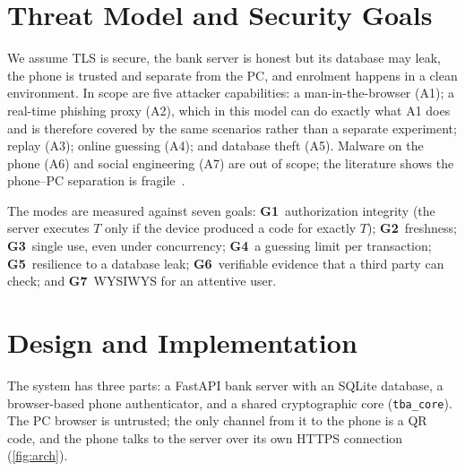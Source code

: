 \section{Threat Model and Security Goals}\label{sec:main-threat}
We assume TLS is secure, the bank server is honest but its database may leak,
the phone is trusted and separate from the PC, and enrolment happens in a clean
environment. In scope are five attacker capabilities: a man-in-the-browser (A1);
a real-time phishing proxy (A2), which in this model can do exactly what A1 does
and is therefore covered by the same scenarios rather than a separate
experiment; replay (A3); online guessing (A4); and database theft (A5). Malware
on the phone (A6) and social engineering (A7) are out of scope; the literature
shows the phone--PC separation is fragile~\cite{dmitrienko2014,konoth2016,haupert2018}.

The modes are measured against seven goals: \textbf{G1}~authorization integrity
(the server executes $T$ only if the device produced a code for exactly $T$);
\textbf{G2}~freshness; \textbf{G3}~single use, even under concurrency;
\textbf{G4}~a guessing limit per transaction; \textbf{G5}~resilience to a
database leak; \textbf{G6}~verifiable evidence that a third party can check; and
\textbf{G7}~WYSIWYS for an attentive user.

\section{Design and Implementation}\label{sec:main-design}
The system has three parts: a FastAPI bank server with an SQLite database, a
browser-based phone authenticator, and a shared cryptographic core
(\texttt{tba\_core}). The PC browser is untrusted; the only channel from it to
the phone is a QR code, and the phone talks to the server over its own HTTPS
connection (\cref{fig:arch}).

